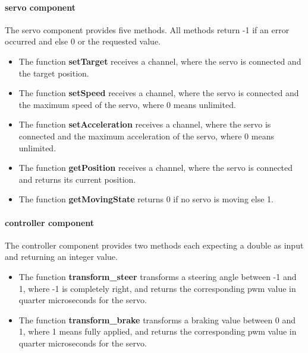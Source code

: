 \paragraph{servo component}
The servo component provides five methods. All methods return -1 if an error occurred and else 0 or the requested value.
\begin{itemize}
\item The function \textbf{setTarget} receives a channel, where the servo is connected and the target position.
\item The function \textbf{setSpeed} receives a channel, where the servo is connected and the maximum speed of the servo, where 0 means unlimited.
\item The function \textbf{setAcceleration} receives a channel, where the servo is connected and the maximum acceleration of the servo, where 0 means unlimited.
\item The function \textbf{getPosition} receives a channel, where the servo is connected and returns its current position.
\item The function \textbf{getMovingState} returns 0 if no servo is moving else 1.
\end{itemize}

\paragraph{controller component}
The controller component provides two methods each expecting a double as input and returning an integer value.
\begin{itemize}
\item The function \textbf{transform\_steer} transforms a steering angle between -1 and 1, where -1 is completely right, and returns the corresponding pwm value in quarter microseconds for the servo.
\item The function \textbf{transform\_brake} transforms a braking value between 0 and 1, where 1 means fully applied, and returns the corresponding pwm value in quarter microseconds for the servo.
\end{itemize}
